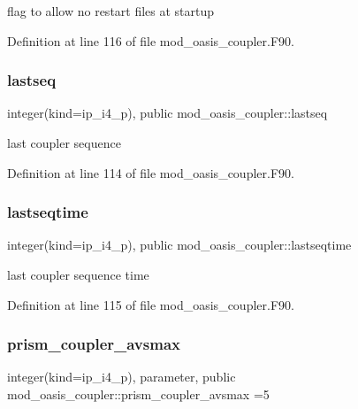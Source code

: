 flag to allow no restart files at startup 



Definition at line 116 of file mod\+\_\+oasis\+\_\+coupler.\+F90.

\mbox{\label{namespacemod__oasis__coupler_a0cb9b8a96c10385d38fa244d920c7eaf}} 
\subsubsection{\texorpdfstring{lastseq}{lastseq}}
{\footnotesize\ttfamily integer(kind=ip\+\_\+i4\+\_\+p), public mod\+\_\+oasis\+\_\+coupler\+::lastseq}



last coupler sequence 



Definition at line 114 of file mod\+\_\+oasis\+\_\+coupler.\+F90.

\mbox{\label{namespacemod__oasis__coupler_a47f4727f94719892d837f6a1545d3d08}} 
\subsubsection{\texorpdfstring{lastseqtime}{lastseqtime}}
{\footnotesize\ttfamily integer(kind=ip\+\_\+i4\+\_\+p), public mod\+\_\+oasis\+\_\+coupler\+::lastseqtime}



last coupler sequence time 



Definition at line 115 of file mod\+\_\+oasis\+\_\+coupler.\+F90.

\mbox{\label{namespacemod__oasis__coupler_a6f166f099a134dffba97a168d28a3c01}} 
\subsubsection{\texorpdfstring{prism\+\_\+coupler\+\_\+avsmax}{prism\_coupler\_avsmax}}
{\footnotesize\ttfamily integer(kind=ip\+\_\+i4\+\_\+p), parameter, public mod\+\_\+oasis\+\_\+coupler\+::prism\+\_\+coupler\+\_\+avsmax =5}



